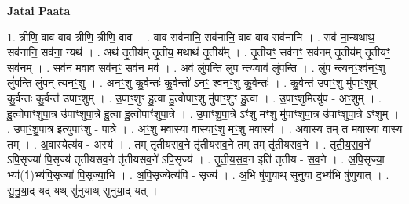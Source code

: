 \documentclass[17pt]{extarticle}
\begin{document}
\textbf{Jatai Paata} \newline

1. त्रीणि॒ वाव वाव त्रीणि॒ त्रीणि॒ वाव । . वाव सव॑नानि॒ सव॑नानि॒ वाव वाव सव॑नानि । . सव॑ ना॒न्यथाथ॒ सव॑नानि॒ सव॑ना॒ न्यथ॑ । . अथ॑ तृ॒तीय॑म् तृ॒तीय॒ मथाथ॑ तृ॒तीय᳚म् । . तृ॒तीयꣳ॒॒ सव॑नꣳ॒॒ सव॑नम् तृ॒तीय॑म् तृ॒तीयꣳ॒॒ सव॑नम् । . सव॑न॒ मवाव॒ सव॑नꣳ॒॒ सव॑न॒ मव॑ । . अव॑ लुंपन्ति लुंप॒ न्त्यवाव॑ लुंपन्ति । . लुं॒प॒ न्त्य॒नꣳ॒॒श्व॑नꣳ॒॒शु लुं॑पन्ति लुंपन् त्यनꣳ॒॒शु । . अ॒नꣳ॒॒शु कु॒र्वन्तः॑ कु॒र्वन्तो॑ ऽनꣳ॒॒ श्व॑नꣳ॒॒शु कु॒र्वन्तः॑ । . कु॒र्वन्त॑ उपाꣳ॒॒शु मु॑पाꣳ॒॒शुम् कु॒र्वन्तः॑ कु॒र्वन्त॑ उपाꣳ॒॒शुम् । . उ॒पाꣳ॒॒शुꣳ हु॒त्वा हु॒त्वोपाꣳ॒॒शु मु॑पाꣳ॒॒शुꣳ हु॒त्वा । . उ॒पाꣳ॒॒शुमित्यु॑प - अꣳ॒॒शुम् । . हु॒त्वोपाꣳ॑शुपा॒त्र उ॑पाꣳशुपा॒त्रे हु॒त्वा हु॒त्वोपाꣳ॑शुपा॒त्रे । . उ॒पाꣳ॒॒शु॒पा॒त्रे ऽꣳ॑शु मꣳ॒॒शु मु॑पाꣳशुपा॒त्र उ॑पाꣳशुपा॒त्रे ऽꣳ॑शुम् । . उ॒पाꣳ॒॒शु॒पा॒त्र इत्यु॑पाꣳशु - पा॒त्रे । . अꣳ॒॒शु म॒वास्या॒ वास्याꣳ॒॒शु मꣳ॒॒शु म॒वास्य॑ । . अ॒वास्य॒ तम् त म॒वास्या॒ वास्य॒ तम् । . अ॒वास्येत्य॑व - अस्य॑ । . तम् तृ॑तीयसव॒ने तृ॑तीयसव॒ने तम् तम् तृ॑तीयसव॒ने । . तृ॒ती॒य॒स॒व॒ने॑ ऽपि॒सृज्या॑ पि॒सृज्य॑ तृतीयसव॒ने तृ॑तीयसव॒ने॑ ऽपि॒सृज्य॑ । . तृ॒ती॒य॒स॒व॒न इति॑ तृतीय - स॒व॒ने । . अ॒पि॒सृज्या॒ भ्या᳚(1॒)भ्य॑पि॒सृज्या॑ पि॒सृज्या॒भि । . अ॒पि॒सृज्येत्य॑पि - सृज्य॑ । . अ॒भि षु॑णुयाथ् सुनुया द॒भ्य॑भि षु॑णुयात् । . सु॒नु॒या॒द् यद् यथ् सु॑नुयाथ् सुनुया॒द् यत् । \newline
\end{document}

